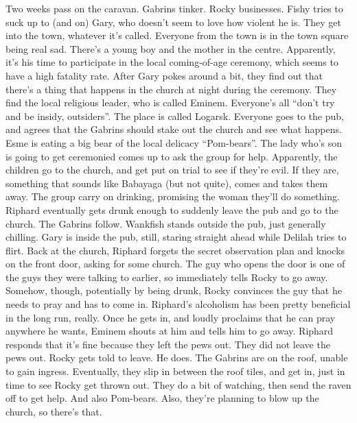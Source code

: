 Two weeks pass on the caravan. Gabrins tinker. Rocky businesses. Fishy tries to suck up to (and on) Gary, who doesn’t seem to love how violent he is.\medskip
They get into the town, whatever it’s called.\medskip
Everyone from the town is in the town square being real sad. There’s a young boy and the mother in the centre.\medskip
Apparently, it’s his time to participate in the local coming-of-age ceremony, which seems to have a high fatality rate. After Gary pokes around a bit, they find out that there’s a thing that happens in the church at night during the ceremony.\medskip
They find the local religious leader, who is called Eminem.\medskip
Everyone’s all “don’t try and be insidy, outsiders”.\medskip
The place is called Logarsk.\medskip
Everyone goes to the pub, and agrees that the Gabrins should stake out the church and see what happens.\medskip
Esme is eating a big bear of the local delicacy “Pom-bears”.\medskip
The lady who’s son is going to get ceremonied comes up to ask the group for help.\medskip
Apparently, the children go to the church, and get put on trial to see if they’re evil. If they are, something that sounds like Babayaga (but not quite), comes and takes them away.\medskip
The group carry on drinking, promising the woman they’ll do something.\medskip
Riphard eventually gets drunk enough to suddenly leave the pub and go to the church. The Gabrins follow.\medskip
Wankfish stands outside the pub, just generally chilling.\medskip
Gary is inside the pub, still, staring straight ahead while Delilah tries to flirt.\medskip
Back at the church, Riphard forgets the secret observation plan and knocks on the front door, asking for some church.\medskip
The guy who opens the door is one of the guys they were talking to earlier, so immediately tells Rocky to go away. Somehow, though, potentially by being drunk, Rocky convinces the guy that he needs to pray and has to come in. Riphard’s alcoholism has been pretty beneficial in the long run, really.\medskip
Once he gets in, and loudly proclaims that he can pray anywhere he wants, Eminem shouts at him and tells him to go away.\medskip
Riphard responds that it’s fine because they left the pews out.\medskip
They did not leave the pews out. Rocky gets told to leave.\medskip
He does.\medskip
The Gabrins are on the roof, unable to gain ingress.\medskip
Eventually, they slip in between the roof tiles, and get in, just in time to see Rocky get thrown out.\medskip
They do a bit of watching, then send the raven off to get help. And also Pom-bears. Also, they’re planning to blow up the church, so there’s that.\medskip
